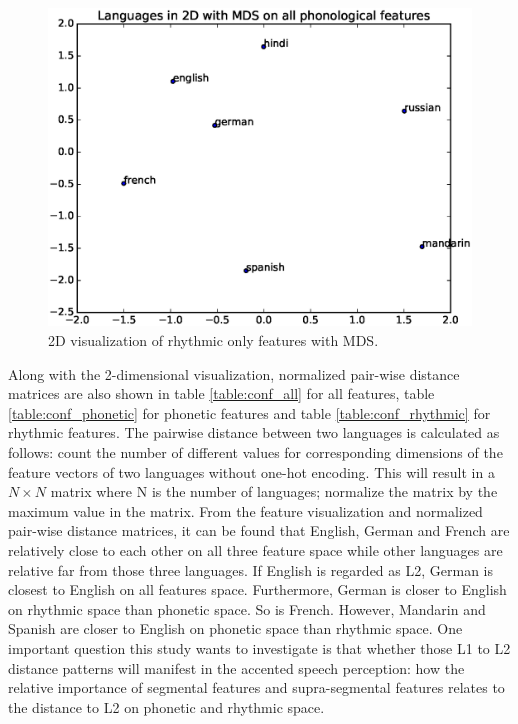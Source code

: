 \begin{figure}
  \includegraphics[width=\linewidth]{figures/rhythmic_MDS.eps}
  \caption{2D visualization of rhythmic only features with MDS.}\label{fig:rhythmic_mds}
\endminipage
\end{figure}

Along with the 2-dimensional visualization, normalized pair-wise distance matrices are also shown in table \ref{table:conf_all} for all features, table \ref{table:conf_phonetic} for phonetic features and table \ref{table:conf_rhythmic} for rhythmic features. The pairwise distance between two languages is calculated as follows: count the number of different values for corresponding dimensions of the feature vectors of two languages without one-hot encoding. This will result in a $N \times N$ matrix where N is the number of languages; normalize the matrix by the maximum value in the matrix. From the feature visualization and normalized pair-wise distance matrices, it can be found that English, German and French are relatively close to each other on all three feature space while other languages are relative far from those three languages. If English is regarded as L2, German is closest to English on all features space. Furthermore, German is closer to English on rhythmic space than phonetic space. So is French. However, Mandarin and Spanish are closer to English on phonetic space than rhythmic space. One important question this study wants to investigate is that whether those L1 to L2 distance patterns will manifest in the accented speech perception: how the relative importance of segmental features and supra-segmental features relates to the distance to L2 on phonetic and rhythmic space.

